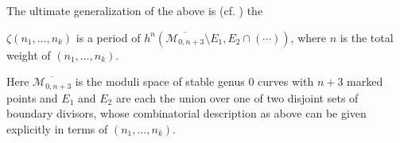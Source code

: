 The ultimate generalization of the above is (cf. \cite{goncharov-2004}) the



\begin{thm}
$\zeta(n_1, \dots, n_k)$ is a period of $h^n(\overline{\mathcal{M}_{0, n+3}} \setminus E_1, E_2 \cap (\cdots))$, where $n$ is the total weight of $(n_1,\dots,n_k)$.
\end{thm}
Here $\overline{\mathcal{M}_{0, n+3}}$ is the moduli space of stable genus 0 curves with $n+3$ marked points and
$E_1$ and $E_2$ are each the union over one of two disjoint sets of boundary divisors, whose combinatorial description 
as above can be given explicitly in terms of $(n_1, \dots, n_k)$.
